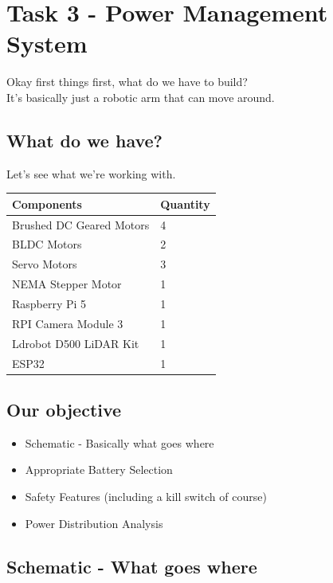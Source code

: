 \documentclass[12pt]{article}
\title{}
\author{EE24BTECH11002 Agamjot Singh\\IIT Hyderabad}
\date{\today}
\begin{document}

\section*{Task 3 - Power Management System}
Okay first things first, what do we have to build?\\
It's basically just a robotic arm that can move around.

\subsection*{What do we have?}
Let's see what we're working with.

\begin{table}[h]
\centering
\begin{tabular}{ll}
\toprule
\textbf{Components} & \textbf{Quantity} \\
\midrule
Brushed DC Geared Motors & 4 \\
BLDC Motors & 2 \\
Servo Motors & 3 \\
NEMA Stepper Motor & 1 \\
Raspberry Pi 5 & 1 \\
RPI Camera Module 3 & 1 \\
Ldrobot D500 LiDAR Kit & 1 \\
ESP32 & 1 \\
\bottomrule
\end{tabular}
\end{table}

\subsection*{Our objective}
\begin{itemize}
\item Schematic - Basically what goes where
\item Appropriate Battery Selection
\item Safety Features (including a kill switch of course)
\item Power Distribution Analysis 
\end{itemize}

\newpage

\subsection*{Schematic - What goes where}
\end{document}
